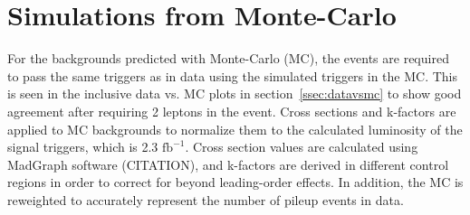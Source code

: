 \clearpage

\section{Simulations from Monte-Carlo}

For the backgrounds predicted with Monte-Carlo (MC), the events are required to pass the same triggers as in data using the simulated triggers in the MC.
This is seen in the inclusive data vs. MC plots in section~\ref{ssec:datavsmc} to show good agreement after requiring 2 leptons in the event.
Cross sections and k-factors are applied to MC backgrounds to normalize them to the calculated luminosity of the signal triggers, which is 2.3 $\mathrm{fb^{-1}}$.
Cross section values are calculated using MadGraph software (CITATION),
and k-factors are derived in different control regions in order to correct for beyond leading-order effects. %
In addition, the MC is reweighted to accurately represent the number of pileup events in data.

